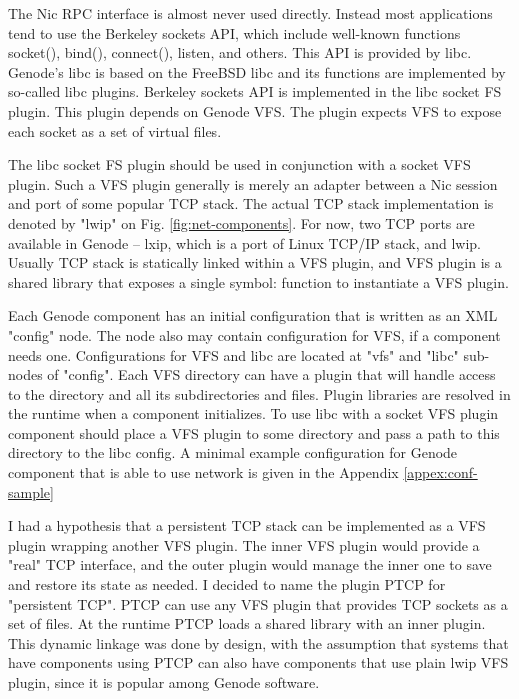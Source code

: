 The Nic RPC interface is almost never used directly. Instead most applications
tend to use the Berkeley sockets API, which include well-known functions
socket(), bind(), connect(), listen, and others. This API is provided by libc.
Genode's libc is based on the FreeBSD libc and its functions are implemented by
so-called libc plugins. Berkeley sockets API is implemented in the libc socket
FS plugin. This plugin depends on Genode VFS. The plugin expects VFS to expose
each socket as a set of virtual files.

The libc socket FS plugin should be used in conjunction with a socket VFS
plugin. Such a VFS plugin generally is merely an adapter between a Nic session
and port of some popular TCP stack. The actual TCP stack implementation is
denoted by "lwip" on Fig. \ref{fig:net-components}. For now, two TCP ports
are available in Genode -- lxip, which is a port of Linux TCP/IP stack, and
lwip. Usually TCP stack is statically linked within a VFS plugin, and VFS
plugin is a shared library that exposes a single symbol: function to
instantiate a VFS plugin.

Each Genode component has an initial configuration that is written as an XML
"config" node. The node also may contain configuration for VFS, if a component
needs one. Configurations for VFS and libc are located at "vfs" and "libc"
sub-nodes of "config". Each VFS directory can have a plugin that will handle
access to the directory and all its subdirectories and files. Plugin libraries
are resolved in the runtime when a component initializes. To use libc with a
socket VFS plugin component should place a VFS plugin to some directory and
pass a path to this directory to the libc config. A minimal example
configuration for Genode component that is able to use network is given in the
Appendix \ref{appex:conf-sample}

I had a hypothesis that a persistent TCP stack can be implemented as a VFS
plugin wrapping another VFS plugin. The inner VFS plugin would provide a "real" 
TCP interface, and the outer plugin would manage the inner one to save and
restore its state as needed. I decided to name the plugin PTCP for "persistent
TCP". PTCP can use any VFS plugin that provides TCP sockets as a set of files.
At the runtime PTCP loads a shared library with an inner plugin. This dynamic
linkage was done by design, with the assumption that systems that have
components using PTCP can also have components that use plain lwip VFS plugin,
since it is popular among Genode software.


